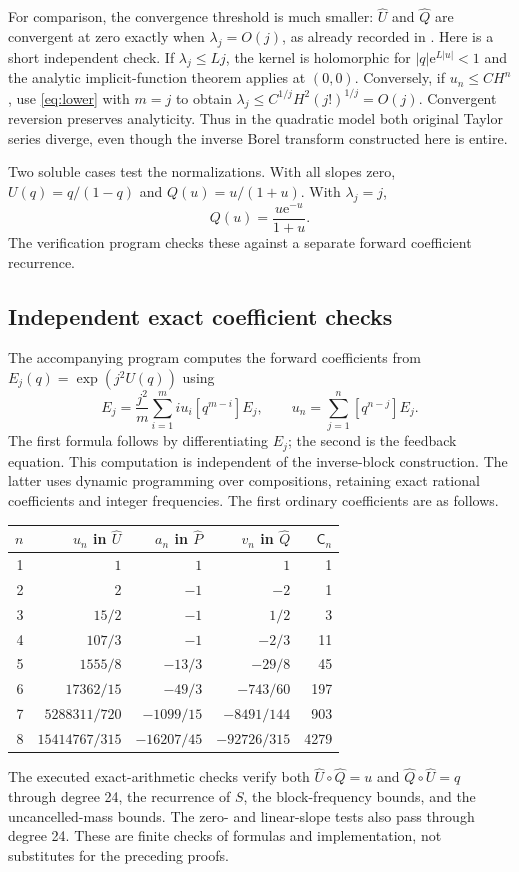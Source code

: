 \documentclass[11pt,a4paper]{article}
\numberwithin{equation}{section}
\theoremstyle{definition}
\theoremstyle{remark}
\newcommand{\U}{\widehat U}
\newcommand{\Q}{\widehat Q}
\newcommand{\Pp}{\widehat P}
\newcommand{\ee}{\mathrm e}
\newcommand{\sh}{\mathsf C}
\begin{document}
For comparison, the convergence threshold is much smaller:
$\U$ and $\Q$ are convergent at zero exactly when $\lambda_j=O(j)$,
as already recorded in \cite{feedback}.  Here is a short independent
check.  If $\lambda_j\le Lj$, the kernel is holomorphic for
$|q|\ee^{L|u|}<1$ and the analytic implicit-function theorem applies at
$(0,0)$.  Conversely, if $u_n\le CH^n$, use \eqref{eq:lower} with $m=j$
to obtain $\lambda_j\le C^{1/j}H^2(j!)^{1/j}=O(j)$.
Convergent reversion preserves analyticity.  Thus in the quadratic model
both original Taylor series diverge, even though the inverse Borel
transform constructed here is entire.

Two soluble cases test the normalizations.  With all slopes zero,
$U(q)=q/(1-q)$ and $Q(u)=u/(1+u)$.  With $\lambda_j=j$,
\begin{equation}
 Q(u)=\frac{u\ee^{-u}}{1+u}.
 \label{eq:linear-check}
\end{equation}
The verification program checks these against a separate forward
coefficient recurrence.

\subsection{Independent exact coefficient checks}
The accompanying program computes the forward coefficients from
$E_j(q)=\exp(j^2U(q))$ using
\begin{equation}
 [q^m]E_j=\frac{j^2}{m}
             \sum_{i=1}^m i u_i[q^{m-i}]E_j,
 \qquad u_n=\sum_{j=1}^n[q^{n-j}]E_j.
 \label{eq:forward-rec}
\end{equation}
The first formula follows by differentiating $E_j$; the second is the
feedback equation.  This computation is independent of the inverse-block
construction.  The latter uses dynamic programming over compositions,
retaining exact rational coefficients and integer frequencies.  The first
ordinary coefficients are as follows.
\begin{center}
\begin{tabular}{@{}r r r r r@{}}
\toprule
$n$ & $u_n$ in $\U$ & $a_n$ in $\Pp$ & $v_n$ in $\Q$ & $\sh_n$\\
\midrule
1 & $1$ & $1$ & $1$ & 1\\
2 & $2$ & $-1$ & $-2$ & 1\\
3 & $15/2$ & $-1$ & $1/2$ & 3\\
4 & $107/3$ & $-1$ & $-2/3$ & 11\\
5 & $1555/8$ & $-13/3$ & $-29/8$ & 45\\
6 & $17362/15$ & $-49/3$ & $-743/60$ & 197\\
7 & $5288311/720$ & $-1099/15$ & $-8491/144$ & 903\\
8 & $15414767/315$ & $-16207/45$ & $-92726/315$ & 4279\\
\bottomrule
\end{tabular}
\end{center}
The executed exact-arithmetic checks verify both
$\U\circ\Q=u$ and $\Q\circ\U=q$ through degree 24, the recurrence of
$S$, the block-frequency bounds, and the uncancelled-mass bounds.  The
zero- and linear-slope tests also pass through degree 24.  These are finite
checks of formulas and implementation, not substitutes for the preceding
proofs.
\end{document}
